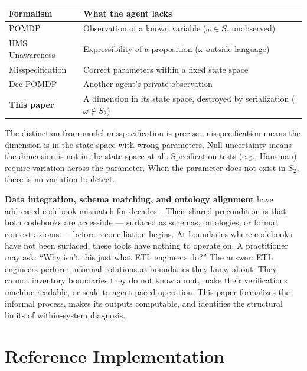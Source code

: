 \documentclass[11pt,a4paper]{article}
\begin{document}
\begin{center}\small
\begin{tabular}{@{}lp{7cm}@{}}
\toprule
\textbf{Formalism} & \textbf{What the agent lacks} \\
\midrule
POMDP & Observation of a known variable ($\omega \in S$, unobserved) \\
HMS Unawareness & Expressibility of a proposition ($\omega$ outside 
language) \\
Misspecification & Correct parameters within a fixed state space \\
Dec-POMDP & Another agent's private observation \\
\midrule
\textbf{This paper} & A dimension in its state space, destroyed by 
serialization ($\omega \notin S_2$) \\
\bottomrule
\end{tabular}
\end{center}

The distinction from model misspecification is precise: 
misspecification means the dimension is in the state space with wrong 
parameters. Null uncertainty means the dimension is not in the state 
space at all. Specification tests (e.g., Hausman) require variation 
across the parameter. When the parameter does not exist in $S_2$, 
there is no variation to detect.

\textbf{Data integration, schema matching, and ontology alignment} 
have addressed codebook mismatch for decades~\cite{rahm2001, 
euzenat2007, goh1999}. Their shared precondition is that both 
codebooks are accessible --- surfaced as schemas, ontologies, or 
formal context axioms --- before reconciliation begins. At boundaries 
where codebooks have not been surfaced, these tools have nothing to 
operate on. A practitioner may ask: ``Why isn't this just what ETL 
engineers do?'' The answer: ETL engineers perform informal rotations 
at boundaries they know about. They cannot inventory boundaries they 
do not know about, make their verifications machine-readable, or 
scale to agent-paced operation. This paper formalizes the informal 
process, makes its outputs computable, and identifies the structural 
limits of within-system diagnosis.


\section{Reference Implementation}
\label{sec:implementation}
\end{document}

